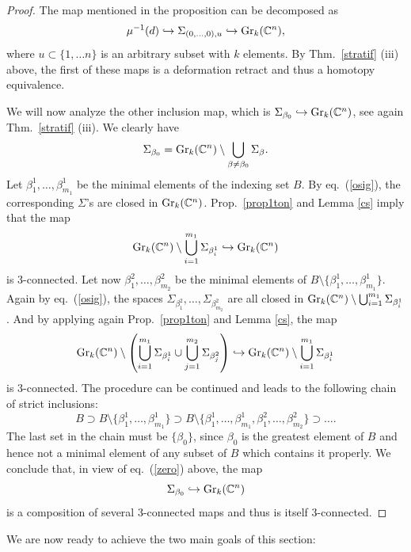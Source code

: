 \documentclass[12pt]{amsart}
\theoremstyle{definition}
\theoremstyle{remark}
\newcommand{\CC}{\mathbb C}
\begin{document}
\begin{proof}
The map mentioned in the proposition can be decomposed as 
$$\mu^{-1}(d) \hookrightarrow \Sigma_{(0,\ldots, 0),u} \hookrightarrow {\rm Gr}_k(\CC^n),$$
where $u\subset \{1, \ldots n\}$ is an arbitrary subset with $k$ elements. 
By Thm.~\ref{stratif} (iii) above, the first of these maps is a deformation retract and thus a homotopy equivalence.

We will now analyze the other inclusion map, which is $\Sigma_{\beta_0}\hookrightarrow  {\rm Gr}_k(\CC^n)$, see again
Thm.~\ref{stratif} (iii). We clearly have
\begin{equation}\label{zero}\Sigma_{\beta_0} = {\rm Gr}_k(\CC^n)\setminus \bigcup_{\beta \neq \beta_0} \Sigma_\beta.\end{equation}
Let $\beta^1_1, \ldots, \beta^1_{m_1}$ be the minimal elements of the indexing set $B$. By eq.~(\ref{osig}), the corresponding
$\Sigma$'s are closed in ${\rm Gr}_k(\CC^n)$. Prop.~\ref{prop1ton} and Lemma \ref{cs} imply that the map
$${\rm Gr}_k(\CC^n) \setminus \bigcup_{i=1}^{m_1}\Sigma_{\beta_i^1}\hookrightarrow {\rm Gr}_k(\CC^n) $$
is 3-connected. Let now $\beta^2_1, \ldots, \beta^2_{m_2}$ be the minimal elements of 
$B\setminus \{\beta^1_1, \ldots, \beta^1_{m_1}\}$. Again by eq.~(\ref{osig}), the spaces $\Sigma_{\beta_1^2}, \ldots, 
\Sigma_{\beta_{m_2}^2}$ are all closed in ${\rm Gr}_k(\CC^n) \setminus \bigcup_{i=1}^{m_1}\Sigma_{\beta_i^1}$. 
And by applying again Prop.~\ref{prop1ton} and Lemma \ref{cs}, the map
 $${\rm Gr}_k(\CC^n) \setminus \left(\bigcup_{i=1}^{m_1}\Sigma_{\beta_i^1}\cup \bigcup_{j=1}^{m_2}\Sigma_{\beta_j^2}\right)\hookrightarrow {\rm Gr}_k(\CC^n) \setminus \bigcup_{i=1}^{m_1}\Sigma_{\beta_i^1}$$
 is $3$-connected. The procedure can be continued and leads to the following chain of strict inclusions:
 $$B\supset B\setminus \{\beta_1^1, \ldots, \beta_{m_1}^1\}\supset B\setminus \{\beta_1^1, \ldots, \beta_{m_1}^1,
 \beta_1^2,\ldots, \beta_{m_2}^2\} \supset \ldots .$$
 The last set in the chain must be $\{\beta_0\}$, since $\beta_0$ is the greatest element of $B$ and hence not a minimal element of any subset of $B$ which contains it properly. 
We conclude that, in view of eq.~(\ref{zero}) above, the map
 $$\Sigma_{\beta_0} \hookrightarrow  {\rm Gr}_k(\CC^n) $$
 is a composition of several 3-connected maps and thus is itself 3-connected. 
\end{proof}

We are now ready to achieve the two main goals of this section:

\vspace{0.2cm}
\end{document}
